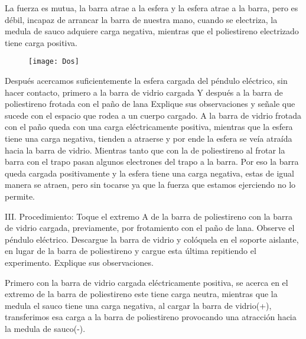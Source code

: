 \documentclass[14pt]{article}
\begin{document}
\begin{multicols}{2}
La fuerza es mutua, la barra atrae a la esfera y la esfera atrae a la barra, pero es débil, incapaz de arrancar la barra de nuestra mano, cuando se electriza, la medula de sauco adquiere carga negativa, mientras que el poliestireno electrizado tiene carga positiva.\\
\begin{figure}
	\begin{center}
		\texttt{[image: Dos]}\\

	\end{center}
\end{figure}

Después acercamos suficientemente la esfera cargada del péndulo eléctrico, sin hacer contacto, primero a la barra de vidrio cargada
Y después a la barra de poliestireno frotada con el paño de lana
 Explique sus observaciones y señale que sucede con el espacio que rodea a un cuerpo cargado.
A la barra de vidrio frotada con el paño queda con una carga eléctricamente positiva, mientras que la esfera tiene una carga negativa, tienden a atraerse y por ende la esfera se veía atraída hacia la barra de vidrio.
Mientras tanto que con la de poliestireno al frotar la barra con el trapo pasan algunos electrones del trapo a la barra. Por eso la barra queda cargada positivamente y la esfera tiene una carga negativa, estas de igual manera se atraen, pero sin tocarse ya que la fuerza que estamos ejerciendo no lo permite.

III. Procedimiento: Toque el extremo A de la barra de poliestireno con la barra de vidrio cargada, previamente, por frotamiento con el paño de lana. Observe el péndulo eléctrico. Descargue la barra de vidrio y colóquela en el soporte aislante, en lugar de la barra de poliestireno y cargue esta última repitiendo el experimento. Explique sus observaciones.
\begin{figure}[h]
	\center
	\hspace{0.3\textwidth}
\end{figure}


Primero con la barra de vidrio cargada eléctricamente positiva, se acerca en el extremo de la barra de poliestireno este tiene carga neutra, mientras que la medula el sauco tiene una carga negativa, al cargar la barra de vidrio(+), transferimos esa carga a la barra de poliestireno provocando una atracción hacia la medula de sauco(-).


\end{multicols}
\end{document}
